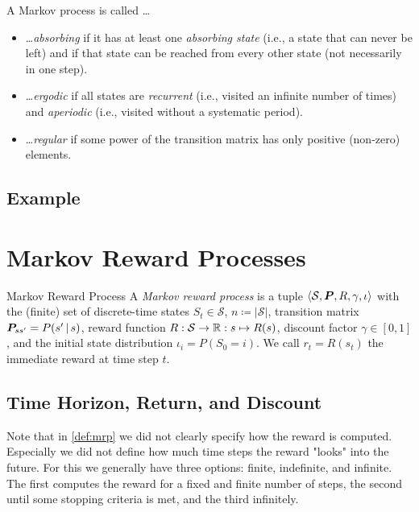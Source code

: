 		\begin{definition}
			A Markov process is called \dots
			\begin{itemize}
				\item \dots \emph{absorbing} if it has at least one \emph{absorbing state} (i.e., a state that can never be left) and if that state can be reached from every other state (not necessarily in one step).
				\item \dots \emph{ergodic} if all states are \emph{recurrent} (i.e., visited an infinite number of times) and \emph{aperiodic} (i.e., visited without a systematic period).
				\item \dots \emph{regular} if some power of the transition matrix has only positive (non-zero) elements.
			\end{itemize}
		\end{definition}

		\subsection{Example} %

	\section{Markov Reward Processes}
		\begin{definition}{Markov Reward Process}  \label{def:mrp}
			A \emph{Markov reward process} is a tuple \( \langle \mathcal{S}, \bm{P}, R, \gamma, \iota \rangle \) with the (finite) set of discrete-time states \(S_t \in \mathcal{S}\), \(n \coloneqq \lvert \mathcal{S} \rvert\), transition matrix \( \bm{P}_{ss'} = P(s' \,\vert\, s) \), reward function \( R : \mathcal{S} \to \mathbb{R} : s \mapsto R(s) \), discount factor \( \gamma \in [0, 1] \), and the initial state distribution \( \iota_i = P(S_0 = i) \). We call \( r_t = R(s_t) \) the immediate reward at time step \(t\).
		\end{definition}

		\subsection{Time Horizon, Return, and Discount}
			Note that in \autoref{def:mrp} we did not clearly specify how the reward is computed. Especially we did not define how much time steps the reward "looks" into the future. For this we generally have three options: finite, indefinite, and infinite. The first computes the reward for a fixed and finite number of steps, the second until some stopping criteria is met, and the third infinitely.

